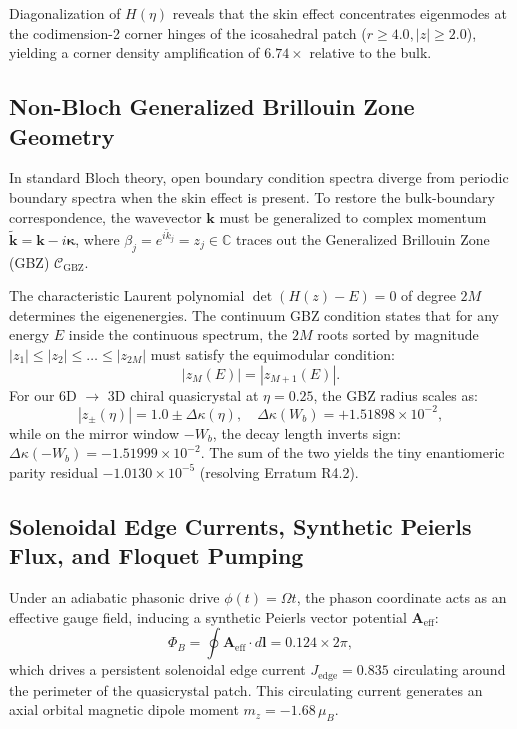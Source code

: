 \documentclass[11pt,a4paper]{article}
\theoremstyle{definition}
\newcommand{\C}{\mathbb{C}}
\begin{document}
Diagonalization of $H(\eta)$ reveals that the skin effect concentrates eigenmodes at the codimension-2 corner hinges of the icosahedral patch ($r \ge 4.0, |z| \ge 2.0$), yielding a corner density amplification of $6.74\times$ relative to the bulk.

\subsection{Non-Bloch Generalized Brillouin Zone Geometry}

In standard Bloch theory, open boundary condition spectra diverge from periodic boundary spectra when the skin effect is present. To restore the bulk-boundary correspondence, the wavevector $\mathbf{k}$ must be generalized to complex momentum $\tilde{\mathbf{k}} = \mathbf{k} - i \boldsymbol{\kappa}$, where $\beta_j = e^{i \tilde{k}_j} = z_j \in \C$ traces out the Generalized Brillouin Zone (GBZ) $\mathcal{C}_{\mathrm{GBZ}}$.

The characteristic Laurent polynomial $\det(H(z) - E) = 0$ of degree $2M$ determines the eigenenergies. The continuum GBZ condition states that for any energy $E$ inside the continuous spectrum, the $2M$ roots sorted by magnitude $|z_1| \le |z_2| \le \dots \le |z_{2M}|$ must satisfy the equimodular condition:
\begin{equation}
|z_M(E)| = |z_{M+1}(E)|.
\end{equation}
For our 6D $\to$ 3D chiral quasicrystal at $\eta = 0.25$, the GBZ radius scales as:
\begin{equation}
|z_\pm(\eta)| = 1.0 \pm \Delta\kappa(\eta), \quad \Delta\kappa(W_b) = +1.51898 \times 10^{-2},
\end{equation}
while on the mirror window $-W_b$, the decay length inverts sign: $\Delta\kappa(-W_b) = -1.51999 \times 10^{-2}$. The sum of the two yields the tiny enantiomeric parity residual $-1.0130 \times 10^{-5}$ (resolving Erratum R4.2).

\subsection{Solenoidal Edge Currents, Synthetic Peierls Flux, and Floquet Pumping}

Under an adiabatic phasonic drive $\phi(t) = \Omega t$, the phason coordinate acts as an effective gauge field, inducing a synthetic Peierls vector potential $\mathbf{A}_{\mathrm{eff}}$:
\begin{equation}
\Phi_B = \oint \mathbf{A}_{\mathrm{eff}} \cdot d\mathbf{l} = 0.124 \times 2\pi,
\end{equation}
which drives a persistent solenoidal edge current $J_{\mathrm{edge}} = 0.835$ circulating around the perimeter of the quasicrystal patch. This circulating current generates an axial orbital magnetic dipole moment $m_z = -1.68 \, \mu_B$. 
\end{document}
